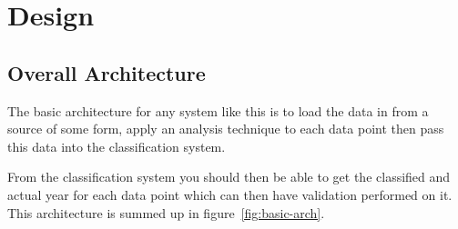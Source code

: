 \chapter{Design}








\section{Overall Architecture}
The basic architecture for any system like this is to load the data in from a source of some form,
apply an analysis technique to each data point then pass this data into the classification system.

From the classification system you should then be able to get the classified and actual year for
each data point which can then have validation performed on it. This architecture is summed up in
figure~\ref{fig:basic-arch}.

